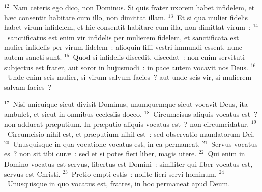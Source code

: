 ${}^{12}$~Nam ceteris ego dico, non Dominus. Si quis frater uxorem habet infidelem, et h\ae c consentit habitare cum illo, non dimittat illam.
${}^{13}$~Et si qua mulier fidelis habet virum infidelem, et hic consentit habitare cum illa, non dimittat virum~:
${}^{14}$~sanctificatus est enim vir infidelis per mulierem fidelem, et sanctificata est mulier infidelis per virum fidelem~: alioquin filii vestri immundi essent, nunc autem sancti sunt.
${}^{15}$~Quod si infidelis discedit, discedat~: non enim servituti subjectus est frater, aut soror in hujusmodi~: in pace autem vocavit nos Deus.
${}^{16}$~Unde enim scis mulier, si virum salvum facies~? aut unde scis vir, si mulierem salvam facies~?


${}^{17}$~Nisi unicuique sicut divisit Dominus, unumquemque sicut vocavit Deus, ita ambulet, et sicut in omnibus ecclesiis doceo.
${}^{18}$~Circumcisus aliquis vocatus est~? non adducat pr\ae putium. In pr\ae putio aliquis vocatus est~? non circumcidatur.
${}^{19}$~Circumcisio nihil est, et pr\ae putium nihil est~: sed observatio mandatorum Dei.
${}^{20}$~Unusquisque in qua vocatione vocatus est, in ea permaneat.
${}^{21}$~Servus vocatus es~? non sit tibi cur\ae~: sed et si potes fieri liber, magis utere.
${}^{22}$~Qui enim in Domino vocatus est servus, libertus est Domini~: similiter qui liber vocatus est, servus est Christi.
${}^{23}$~Pretio empti estis~: nolite fieri servi hominum.
${}^{24}$~Unusquisque in quo vocatus est, fratres, in hoc permaneat apud Deum.


